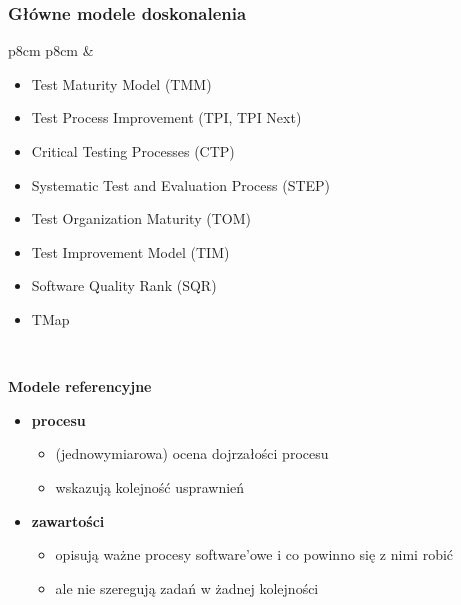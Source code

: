 \documentclass[../main.tex]{subfiles}
\begin{document}
    \subsubsection{Główne modele doskonalenia}
    \begin{table}[H]
        \begin{center}
            \begin{tabular}{p{8cm} p{8cm}}
                &
                \begin{itemize}
                    \item Test Maturity Model (TMM)
                    \item Test Process Improvement (TPI, TPI Next)
                \end{itemize}
                \begin{itemize}
                    \item Critical Testing Processes (CTP)
                    \item Systematic Test and Evaluation Process (STEP)
                    \item Test Organization Maturity (TOM)
                    \item Test Improvement Model (TIM)
                    \item Software Quality Rank (SQR)
                    \item TMap
                \end{itemize}\\
            \end{tabular}
        \end{center}
    \end{table}

    \textbf{Modele referencyjne}
    \begin{itemize}
        \item \textbf{procesu}
        \begin{itemize}
            \item (jednowymiarowa) ocena dojrzałości procesu
            \item wskazują kolejność usprawnień
        \end{itemize}
        \item \textbf{zawartości}
        \begin{itemize}
            \item opisują ważne procesy software’owe i co powinno się z nimi robić
            \item ale nie szeregują zadań w żadnej kolejności
        \end{itemize}
    \end{itemize}
\end{document}
